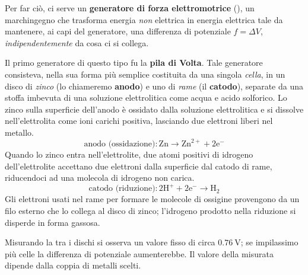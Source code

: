 Per far ciò, ci serve un \textbf{generatore di forza elettromotrice} (\fem), un marchingegno che trasforma energia \textit{non} elettrica in energia elettrica tale da mantenere, ai capi del generatore, una differenza di potenziale $f=\Delta V$, \textit{indipendentemente} da cosa ci si collega.\label{fem}
\begin{digressionwt}
	Il primo generatore di questo tipo fu la \textbf{pila di Volta}. Tale generatore consisteva, nella sua forma più semplice costituita da una singola \textit{cella}, in un disco di \textit{zinco} (lo chiameremo \textbf{anodo}) e uno di \textit{rame} (il \textbf{catodo}), separate da una stoffa imbevuta di una soluzione elettrolitica come acqua e acido solforico.
	Lo zinco sulla superficie dell'anodo è ossidato dalla soluzione elettrolitica e si dissolve nell'elettrolita come ioni carichi positiva, lasciando due elettroni liberi nel metallo.
	\begin{equation*}
		\text{anodo (ossidazione)}\colon \mathrm{Zn}\to\mathrm{Zn}^{2+}+2\mathrm{e}^{-}
	\end{equation*}
	Quando lo zinco entra nell'elettrolite, due atomi positivi di idrogeno dell'elettrolite accettano due elettroni dalla superficie dal catodo di rame, riducendoci ad una molecola di idrogeno non carica.
	\begin{equation*}
		\text{catodo (riduzione)}\colon2\mathrm{H}^{+}+2\mathrm{e}^{-}\to\mathrm{H}_2
	\end{equation*}
	Gli elettroni usati nel rame per formare le molecole di ossigine provengono da un filo esterno che lo collega al disco di zinco; l'idrogeno prodotto nella riduzione si disperde in forma gassosa.

	Misurando la \ddp tra i dischi si osserva un valore fisso di circa $\SI{0,76}{\volt}$; se impilassimo più celle la differenza di potenziale aumenterebbe. Il valore della  \ddp misurata dipende dalla coppia di metalli scelti.
\end{digressionwt}
